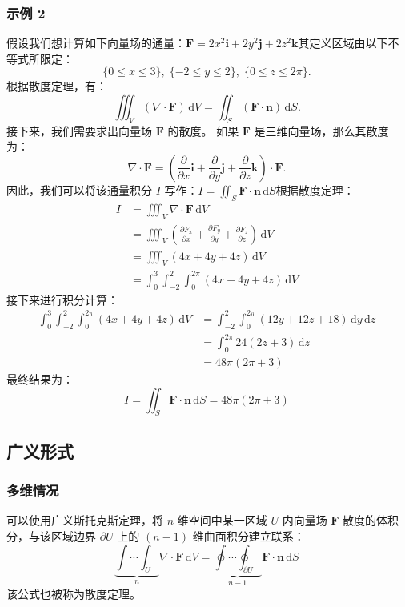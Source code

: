 \subsubsection{示例 2}
假设我们想计算如下向量场的通量：$\mathbf{F} = 2x^2\mathbf{i} + 2y^2\mathbf{j} + 2z^2\mathbf{k}$其定义区域由以下不等式所限定：
$$
\{0 \leq x \leq 3\},\;\{-2 \leq y \leq 2\},\;\{0 \leq z \leq 2\pi\}.~
$$
根据散度定理，有：
$$
\iiint_{V} \left(\nabla \cdot \mathbf{F}\right)\,\mathrm{d}V
= 
\iint_{S} 
(\mathbf{F} \cdot \mathbf{n})\,\mathrm{d}S.~
$$
接下来，我们需要求出向量场 $\mathbf{F}$ 的散度。
如果 $\mathbf{F}$ 是三维向量场，那么其散度为：
$$
\nabla \cdot \mathbf{F}
=
\left(
\frac{\partial}{\partial x}\mathbf{i}
+ 
\frac{\partial}{\partial y}\mathbf{j}
+ 
\frac{\partial}{\partial z}\mathbf{k}
\right)
\cdot
\mathbf{F}.~
$$
因此，我们可以将该通量积分 $I$ 写作：$I = \iint_{S} \mathbf{F} \cdot \mathbf{n} \,\mathrm{d}S$根据散度定理：
$$
\begin{aligned}
I &= \iiint_{V} \nabla \cdot \mathbf{F} \,\mathrm{d}V \\[6pt]
  &= \iiint_{V} \left(\frac{\partial F_x}{\partial x} + \frac{\partial F_y}{\partial y} + \frac{\partial F_z}{\partial z}\right)\,\mathrm{d}V \\[6pt]
  &= \iiint_{V} (4x + 4y + 4z)\,\mathrm{d}V \\[6pt]
  &= \int_{0}^{3} \int_{-2}^{2} \int_{0}^{2\pi} (4x + 4y + 4z)\,\mathrm{d}V
\end{aligned}~
$$
接下来进行积分计算：
$$
\begin{aligned}
\int_{0}^{3} \int_{-2}^{2} \int_{0}^{2\pi} (4x + 4y + 4z)\,\mathrm{d}V
&= \int_{-2}^{2} \int_{0}^{2\pi} (12y + 12z + 18)\,\mathrm{d}y\,\mathrm{d}z \\[6pt]
&= \int_{0}^{2\pi} 24(2z + 3)\,\mathrm{d}z \\[6pt]
&= 48\pi (2\pi + 3)
\end{aligned}~
$$
最终结果为：
$$
\boxed{
I = \iint_{S} \mathbf{F} \cdot \mathbf{n} \,\mathrm{d}S
= 48\pi (2\pi + 3)}~
$$
\subsection{广义形式}
\subsubsection{多维情况}
可以使用广义斯托克斯定理，将 $n$ 维空间中某一区域 $U$ 内向量场 $\mathbf{F}$ 散度的体积分，与该区域边界 $\partial U$ 上的 $(n-1)$ 维曲面积分建立联系：
$$
\underbrace{\int \cdots \int_{U}}_{n} 
\nabla \cdot \mathbf{F} \, \mathrm{d}V
=
\underbrace{\oint \cdots \oint_{\partial U}}_{n-1}
\mathbf{F} \cdot \mathbf{n} \, \mathrm{d}S~
$$
该公式也被称为散度定理。

